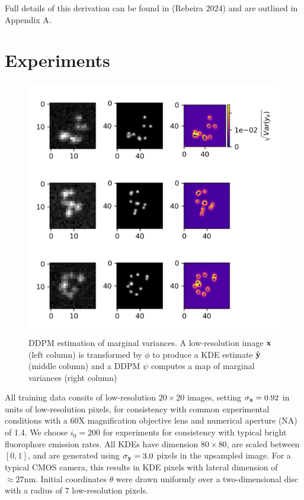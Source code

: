 \documentclass{article}
\begin{document}
Full details of this derivation can be found in (Rebeira 2024) and are outlined in Appendix A. 

\section{Experiments}

\begin{figure}
\centering
\includegraphics[scale=1.2]{Bayes.png}
\caption{DDPM estimation of marginal variances. A low-resolution image $\bold{x}$ (left column) is transformed by $\phi$ to produce a KDE estimate $\hat{\bold{y}}$ (middle column) and a DDPM $\psi$ computes a map of marginal variances (right column)}
\end{figure}

All training data consits of low-resolution $20\times 20$ images, setting $\sigma_{\bold{x}}=0.92$ in units of low-resolution pixels, for consistency with common experimental conditions with a 60X magnification objective lens and numerical aperture (NA) of 1.4. We choose $i_{0}=200$ for experiments for consistency with typical bright fluorophore emission rates. All KDEs have dimension $80\times 80$, are scaled between $[0,1]$, and are generated using $\sigma_{\bold{y}}=3.0$ pixels in the upsampled image. For a typical CMOS camera, this results in KDE pixels with lateral dimension of $\approx 27\mathrm{nm}$. Initial coordinates $\theta$ were drawn uniformly over a two-dimensional disc with a radius of 7 low-resolution pixels.
\end{document}
